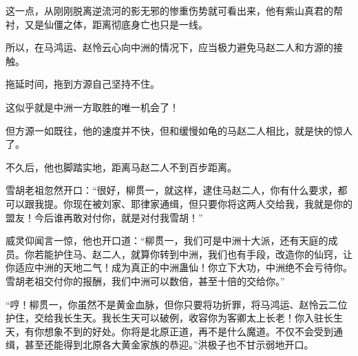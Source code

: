\begin{this_body}
这一点，从刚刚脱离逆流河的影无邪的惨重伤势就可看出来，他有紫山真君的帮衬，又是仙僵之体，距离彻底身亡也只是一线。

所以，在马鸿运、赵怜云心向中洲的情况下，应当极力避免马赵二人和方源的接触。

拖延时间，拖到方源自己坚持不住。

这似乎就是中洲一方取胜的唯一机会了！

但方源一如既往，他的速度并不快，但和缓慢如龟的马赵二人相比，就是快的惊人了。

不久后，他也脚踏实地，距离马赵二人不到百步距离。

雪胡老祖忽然开口：“很好，柳贯一，就这样，逮住马赵二人，你有什么要求，都可以跟我提。你现在被刘家、耶律家通缉，但只要你将这两人交给我，我就是你的盟友！今后谁再敢对付你，就是对付我雪胡！”

威灵仰闻言一惊，他也开口道：“柳贯一，我们可是中洲十大派，还有天庭的成员。你若能护住马、赵二人，就算你转到中洲，我们也有手段，改造你的仙窍，让你适应中洲的天地二气！成为真正的中洲蛊仙！你立下大功，中洲绝不会亏待你。雪胡老祖交付你的报酬，我们中洲可以数倍，甚至十倍的交给你。”

“哼！柳贯一，你虽然不是黄金血脉，但你只要将功折罪，将马鸿运、赵怜云二位护住，交给我长生天。我长生天可以破例，收容你为客卿太上长老！你入驻长生天，有你想象不到的好处。你将是北原正道，再不是什么魔道。不仅不会受到通缉，甚至还能得到北原各大黄金家族的恭迎。”洪极子也不甘示弱地开口。

\end{this_body}


